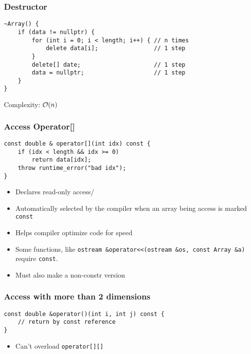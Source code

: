 \subsubsection{Destructor}
\begin{lstlisting}[style=C++]
~Array() {
    if (data != nullptr) {
        for (int i = 0; i < length; i++) { // n times
            delete data[i];                // 1 step
        }
        delete[] date;                     // 1 step
        data = nullptr;                    // 1 step
    }
}
\end{lstlisting}
Complexity: $\mathcal{O}(n)$

\subsubsection{Access Operator[]}
\begin{lstlisting}[style=C++]
const double & operator[](int idx) const {
    if (idx < length && idx >= 0)
        return data[idx];
    throw runtime_error("bad idx");
}
\end{lstlisting}
\begin{itemize}
	\item Declares read-only access/
	\item Automatically selected by the compiler when an array being access is marked \lstinline[style=C++]{const}
	\item Helps compiler optimize code for speed
	\item Some functions, like \lstinline[style=C++]{ostream &operator<<(ostream &os, const Array &a)} require \lstinline[style=C++]{const}.
	\item Must also make a non-constr version
\end{itemize}

\subsubsection{Access with more than 2 dimensions}
\begin{lstlisting}[style=C++]
const double &operator()(int i, int j) const {
    // return by const reference
}
\end{lstlisting}
\begin{itemize}
	\item Can't overload \lstinline[style=C++]{operator[][]}
\end{itemize}

